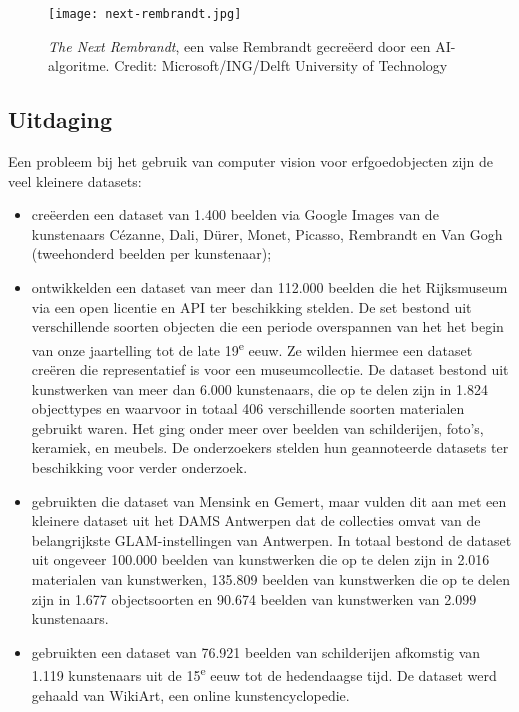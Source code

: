 \begin{figure}
	\centering
	\texttt{[image: next-rembrandt.jpg]}
	\caption[\textit{The Next Rembrandt}, een valse Rembrandt gecreëerd door een AI-algoritme]{\textit{The Next Rembrandt}, een valse Rembrandt gecreëerd door een AI-algoritme. Credit: Microsoft/ING/Delft University of Technology}
\end{figure}

\subsection{Uitdaging}
\label{subsec:cv-voor-ce-uitdaging}

Een probleem bij het gebruik van computer vision voor erfgoedobjecten zijn de veel kleinere datasets: 
\begin{itemize}
	\item \textcite{Blessings2013} cre\"{e}erden een dataset van 1.400 beelden via Google Images van de kunstenaars C\'{e}zanne, Dali, D\"{u}rer, Monet, Picasso, Rembrandt en Van Gogh (tweehonderd beelden per kunstenaar);
	\item \textcite{Mensink2014} ontwikkelden een dataset van meer dan 112.000 beelden die het Rijksmuseum via een open licentie en API ter beschikking stelden. De set bestond uit verschillende soorten objecten die een periode overspannen van het het begin van onze jaartelling tot de late 19\textsuperscript{e} eeuw. Ze wilden hiermee een dataset cre\"{e}ren die representatief is voor een museumcollectie. De dataset bestond uit kunstwerken van meer dan 6.000 kunstenaars, die op te delen zijn in 1.824 objecttypes en waarvoor in totaal 406 verschillende soorten materialen gebruikt waren. Het ging onder meer over beelden van schilderijen, foto’s, keramiek, en meubels. De onderzoekers stelden hun geannoteerde datasets ter beschikking voor verder onderzoek.
	\item \textcite{Sabatteli2018} gebruikten die dataset van Mensink en Gemert, maar vulden dit aan met een kleinere dataset uit het DAMS Antwerpen dat de collecties omvat van de belangrijkste GLAM-instellingen van Antwerpen. In totaal bestond de dataset uit ongeveer 100.000 beelden van kunstwerken die op te delen zijn in 2.016 materialen van kunstwerken, 135.809 beelden van kunstwerken die op te delen zijn in 1.677 objectsoorten en 90.674 beelden van kunstwerken van 2.099 kunstenaars.
	\item \textcite{Elgammal2018} gebruikten een dataset van 76.921 beelden van schilderijen afkomstig van 1.119 kunstenaars uit de 15\textsuperscript{e} eeuw tot de hedendaagse tijd.  De dataset werd gehaald van WikiArt, een online kunstencyclopedie.
\end{itemize}

